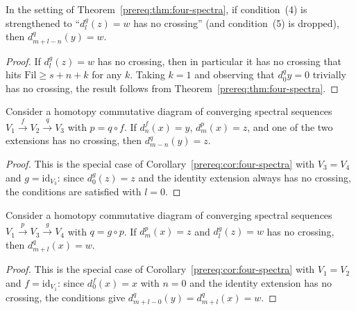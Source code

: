 \begin{corollary}\label{prereq:cor:four-spectra}
    \leanok
    In the setting of Theorem~\ref{prereq:thm:four-spectra}, if condition~(4) is strengthened to ``$d_l^g(z) = w$ has no crossing'' (and condition~(5) is dropped), then $d_{m+l-n}^q(y) = w$.
\end{corollary}
\begin{proof} If $d_l^g(z) = w$ has no crossing, then in particular it has no crossing that hits $\mathrm{Fil} \ge s + n + k$ for any $k$. Taking $k = 1$ and observing that $d_0^q y = 0$ trivially has no crossing, the result follows from Theorem~\ref{prereq:thm:four-spectra}.  %
\end{proof}

\begin{corollary}\label{prereq:cor:triangle-map}
    \leanok
    Consider a homotopy commutative diagram of converging spectral sequences $V_1 \xrightarrow{f} V_2 \xrightarrow{q} V_3$ with $p = q \circ f$. If $d_n^f(x) = y$, $d_m^p(x) = z$, and one of the two extensions has no crossing, then $d_{m-n}^q(y) = z$.
\end{corollary}
\begin{proof} This is the special case of Corollary~\ref{prereq:cor:four-spectra} with $V_3 = V_4$ and $g = \mathrm{id}_{V_3}$: since $d_0^g(z) = z$ and the identity extension always has no crossing, the conditions are satisfied with $l = 0$.  %
\end{proof}

\begin{corollary}\label{prereq:cor:composition-ext}
    \leanok
    Consider a homotopy commutative diagram of converging spectral sequences $V_1 \xrightarrow{p} V_3 \xrightarrow{g} V_4$ with $q = g \circ p$. If $d_m^p(x) = z$ and $d_l^g(z) = w$ has no crossing, then $d_{m+l}^q(x) = w$.
\end{corollary}
\begin{proof} This is the special case of Corollary~\ref{prereq:cor:four-spectra} with $V_1 = V_2$ and $f = \mathrm{id}_{V_1}$: since $d_0^f(x) = x$ with $n = 0$ and the identity extension has no crossing, the conditions give $d_{m+l-0}^q(y) = d_{m+l}^q(x) = w$.  %
\end{proof}

